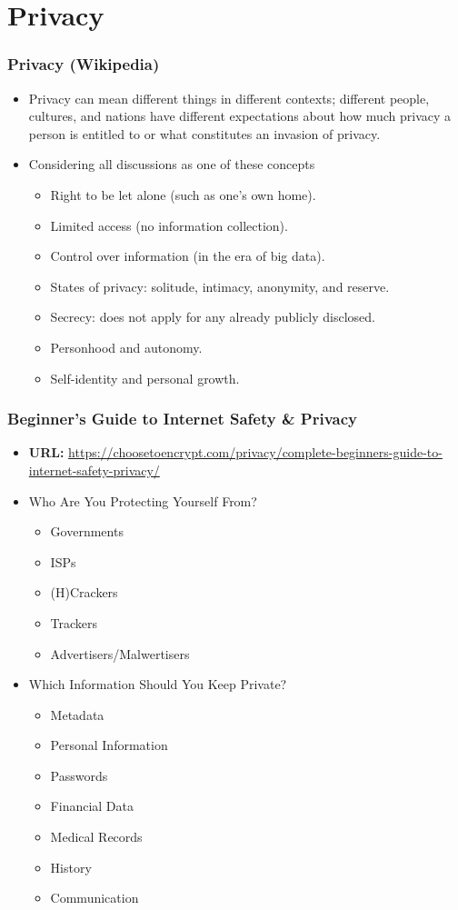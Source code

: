 \documentclass[xcolor=table, notheorems, hyperref={pdfpagelabels=false}]{beamer}
\begin{document}
\section{Privacy}
\begin{frame}[fragile]
\frametitle{Privacy (Wikipedia)}
\begin{itemize}
\item Privacy can mean different things in different contexts; different people, 
      cultures, and nations have different expectations about how much privacy 
      a person is entitled to or what constitutes an invasion of privacy.
\item Considering all discussions as one of these concepts
\begin{itemize}
\item Right to be let alone (such as one's own home).
\item Limited access (no information collection).
\item Control over information (in the era of big data).
\item States of privacy: solitude, intimacy, anonymity, and reserve.
\item Secrecy: does not apply for any already publicly disclosed.
\item Personhood and autonomy.
\item Self-identity and personal growth.
\end{itemize}
\end{itemize}
\end{frame}

\begin{frame}[fragile]
\frametitle{Beginner's Guide to Internet Safety \& Privacy}
\begin{itemize}
\item \textbf{URL:} \url{https://choosetoencrypt.com/privacy/complete-beginners-guide-to-internet-safety-privacy/}
\item Who Are You Protecting Yourself From?
\begin{itemize}
\item Governments
\item ISPs
\item (H)Crackers
\item Trackers
\item Advertisers/Malwertisers
\end{itemize}
\item Which Information Should You Keep Private?
\begin{itemize}
\item Metadata
\item Personal Information
\item Passwords
\item Financial Data
\item Medical Records
\item History
\item Communication
\end{itemize}
\end{itemize}
\end{frame}
\end{document}
